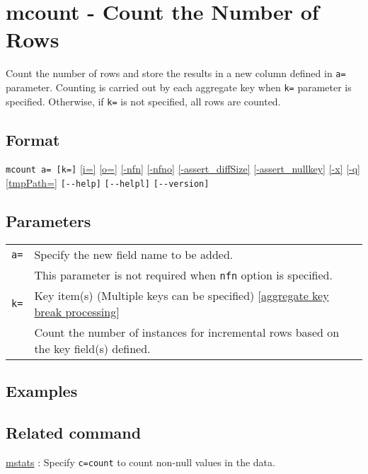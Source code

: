 
%

\section{mcount - Count the Number of Rows\label{sect:mcount}}
Count the number of rows and store the results in a new column defined in \verb|a=| parameter. Counting is carried out by each aggregate key when \verb|k=| parameter is specified. Otherwise, if \verb|k=|  is not specified, all rows are counted. 

\subsection*{Format}
\verb|mcount a= [k=]|
\hyperref[sect:option_i]{[i=]}
\hyperref[sect:option_o]{[o=]}
\hyperref[sect:option_nfn]{[-nfn]} 
\hyperref[sect:option_nfno]{[-nfno]}  
\hyperref[sect:option_assert_diffSize]{[-assert\_diffSize]}
\hyperref[sect:option_assert_nullkey]{[-assert\_nullkey]}
\hyperref[sect:option_x]{[-x]}
\hyperref[sect:option_q]{[-q]}
\hyperref[sect:option_option_tmppath]{[tmpPath=]}
\verb|[--help]|
\verb|[--helpl]|
\verb|[--version]|\\

\subsection*{Parameters}
\begin{table}[htbp]
{\small
\begin{tabular}{ll}
\verb|a=|    & Specify the new field name to be added. \\
             & This parameter is not required when \verb|nfn| option is specified.\\
\verb|k=|    & Key item(s) (Multiple keys can be specified) [\hyperref[sect:option_k]{aggregate key break processing}]\\
             & Count the number of instances for incremental rows based on the key field(s) defined.  \\
\end{tabular} 
}
\end{table} 


\subsection*{Examples}


\subsection*{Related command}
\hyperref[sect:mstats]{mstats} : Specify \verb|c=count| to count non-null values in the data.  

%

